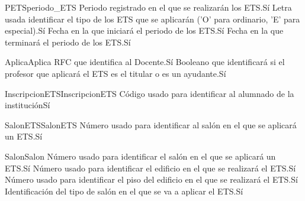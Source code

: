 \begin{cdtEntidad}{PETS}{periodo\_ETS}
	{Periodo registrado en el que se realizarán los ETS.}{Sí}
	{Letra usada identificar el tipo de los ETS que se aplicarán ('O' para ordinario, 'E' para especial).}{Sí}
	{Fecha en la que iniciará el periodo de los ETS.}{Sí}
	{Fecha en la que terminará el periodo de los ETS.}{Sí}
\end{cdtEntidad}
\begin{cdtEntidad}{Aplica}{Aplica}
	{RFC que identifica al Docente.}{Sí}
	{Booleano que identificará si el profesor que aplicará el ETS es el titular o es un ayudante.}{Sí}
\end{cdtEntidad}
\begin{cdtEntidad}{InscripcionETS}{InscripcionETS}
	{Código usado para identificar al alumnado de la institución}{Sí}
\end{cdtEntidad}
\begin{cdtEntidad}{SalonETS}{SalonETS}
	{Número usado para identificar al salón en el que se aplicará un ETS.}{Sí}
\end{cdtEntidad}
\begin{cdtEntidad}{Salon}{Salon}
	{Número usado para identificar el salón en el que se aplicará un ETS.}{Sí}
	{Número usado para identificar el edificio en el que se realizará el ETS.}{Sí}
	{Número usado para identificar el piso del edificio en el que se realizará el ETS.}{Sí}
	{Identificación del tipo de salón en el que se va a aplicar el ETS.}{Sí}
\end{cdtEntidad}
